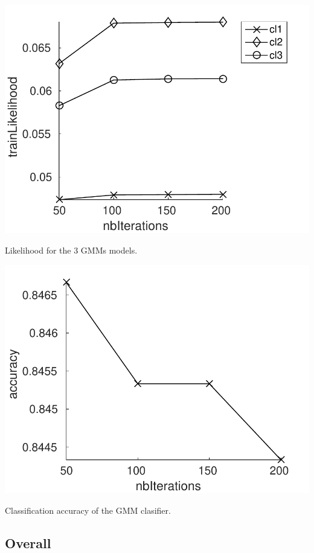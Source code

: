\documentclass[12pt,a4paper,fleqn]{tufte-handout}
\begin{document}
\begin{marginfigure}
\includegraphics[width=\textwidth]{figures/likelihood}
\caption{Likelihood for the 3 GMMs models.}
\label{like}
\end{marginfigure}

\begin{marginfigure}
\includegraphics[width=\textwidth]{figures/accuracy}
\caption{Classification accuracy of the GMM clasifier.}
\label{acc}
\end{marginfigure}


\subsection{Overall}	
\end{document}
